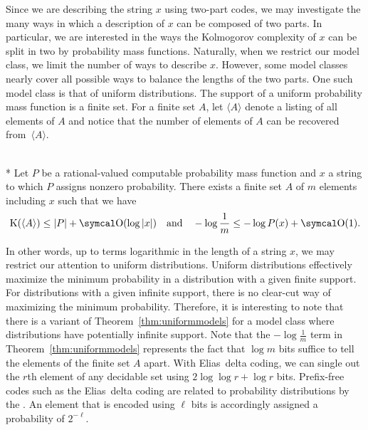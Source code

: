 Since we are describing the string $x$ using two-part codes, we may investigate the many ways in which a description of $x$ can be composed of two parts.
In particular, we are interested in the ways the Kolmogorov complexity of $x$ can be split in two by probability mass functions.
Naturally, when we restrict our model class, we limit the number of ways to describe $x$.
However, some model classes nearly cover all possible ways to balance the lengths of the two parts.
One such model class is that of uniform distributions.
The support of a uniform probability mass function is a finite set.
For a finite set $A$, let $\langle A\rangle$ denote a listing of all elements of $A$ and notice that the number of elements of $A$ can be recovered from~$\langle A\rangle$.
\begin{theorem}\hspace{0pt}\\*
\label{thm:uniformmodels}%
  Let $P$ be a rational-valued computable probability mass function and $x$ a string to which $P$ assigns nonzero probability.
  There exists a finite set $A$ of $m$ elements including $x$ such that we have
  \begin{equation*}
    \KC(\langle A\rangle) \le \length{P} + \bigO(\log \length{x}) \quad\text{and}\quad -\log \frac{1}{m} \le -\log P(x) + \bigO(1).
  \end{equation*}
\end{theorem}
In other words, up to terms logarithmic in the length of a string $x$, we may restrict our attention to uniform distributions.
Uniform distributions effectively maximize the minimum probability in a distribution with a given finite support.
For distributions with a given infinite support, there is no clear-cut way of maximizing the minimum probability.
Therefore, it is interesting to note that there is a variant of Theorem~\ref{thm:uniformmodels} for a model class where distributions have potentially infinite support.
Note that the $-\log \frac{1}{m}$ term in Theorem~\ref{thm:uniformmodels} represents the fact that $\log m$ bits suffice to tell the elements of the finite set $A$ apart.
With Elias~delta coding, we can single out the $r$th element of any decidable set using $2 \log \log r + \log r$ bits.
Prefix-free codes such as the Elias~delta coding are related to probability distributions by the  \parencite{cover2006elements,li2008introduction}.
An element that is encoded using $\ell$ bits is accordingly assigned a probability of $2^{-\ell}$.
